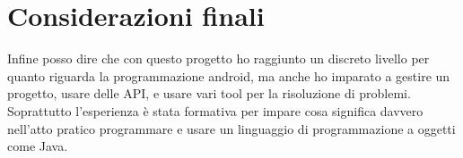 \documentclass{article}
\begin{document}
\section{Considerazioni finali}
Infine posso dire che con questo progetto ho raggiunto un discreto livello per quanto riguarda la programmazione android, ma anche ho imparato a gestire un progetto, usare delle API, e usare vari tool per la risoluzione di problemi. Soprattutto l'esperienza è stata formativa per impare cosa significa davvero nell'atto pratico programmare e usare un linguaggio di programmazione a oggetti come Java.
\end{document}

